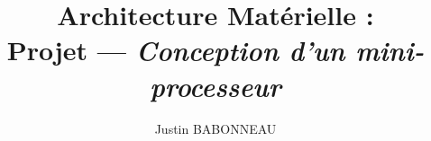 \documentclass[twoside, 12pt, a4paper]{article}
\begin{document}
\shorthandoff{:}

\newcommand{\tf}[4]{
\begin{figure}[!h]
   \begin{minipage}{0.48\textwidth}
     \centering
     \texttt{[image: \#1]}
     \caption{#2}
   \end{minipage}\hfill
   \begin{minipage}{0.48\textwidth}
     \centering
     \texttt{[image: \#3]}
     \caption{#4}
   \end{minipage}
\end{figure}
}

\newcommand{\tmf}[4]{
\begin{figure}[!h]
   \begin{minipage}{0.5\textwidth}
     \centering
     \inputminted[]{asm}{#1}
     \caption{\texttt{#2}}
     \label{fig:#2}
   \end{minipage}\hfill
   \begin{minipage}{0.46\textwidth}
     \centering    
     \inputminted[]{asm}{#3}
     \caption{\texttt{#4}}
     \label{fig:#4}
   \end{minipage}
\end{figure}
}


\makeatletter

\renewcommand\subsubsection{\@startsection{subsubsection}{3}{\z@} {-3.25ex\@plus -1ex \@minus -.2ex}%
{1.5ex \@plus .2ex}%
{\color{gray}\normalfont\normalsize\fontsize{12}{17}\selectfont}}

\makeatother

\pagestyle{fancy}

\fancyhead{}\fancyfoot{}


\fancyfoot[C]{\thepage}

\title{Architecture Matérielle : \\ 
\textbf{Projet} --- \textit{Conception d'un mini-processeur}}

\author{Justin \textsc{BABONNEAU}}
\end{document}
